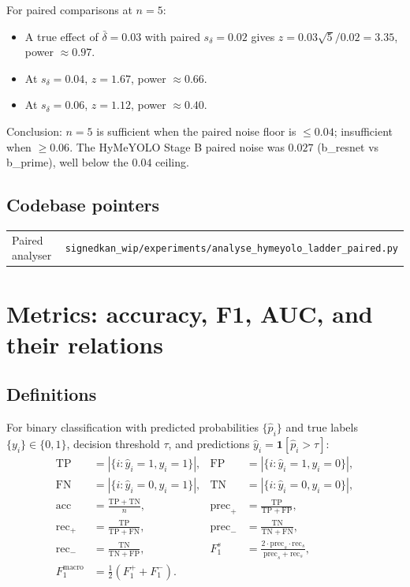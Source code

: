 \documentclass[11pt,a4paper]{article}
\theoremstyle{remark}
\newcommand{\indic}[1]{\mathbf{1}\!\left[#1\right]}
\begin{document}
For paired comparisons at $n = 5$:
\begin{itemize}
\item A true effect of $\bar\delta = 0.03$ with paired
      $s_\delta = 0.02$ gives $z = 0.03 \sqrt 5 / 0.02 = 3.35$,
      power $\approx 0.97$.
\item At $s_\delta = 0.04$, $z = 1.67$, power $\approx 0.66$.
\item At $s_\delta = 0.06$, $z = 1.12$, power $\approx 0.40$.
\end{itemize}
Conclusion: $n = 5$ is sufficient when the paired noise floor is
$\leq 0.04$; insufficient when $\geq 0.06$. The HyMeYOLO Stage B
paired noise was $0.027$ (b\_resnet vs b\_prime), well below the
$0.04$ ceiling.

\subsection{Codebase pointers}

\begin{tabular}{ll}
Paired analyser & \texttt{signedkan\_wip/experiments/analyse\_hymeyolo\_ladder\_paired.py} \\
\end{tabular}

\section{Metrics: accuracy, F1, AUC, and their relations}\label{sec:metrics}

\subsection{Definitions}

For binary classification with predicted probabilities
$\{\hat p_i\}$ and true labels $\{y_i\} \in \{0, 1\}$, decision
threshold $\tau$, and predictions $\hat y_i = \indic{\hat p_i > \tau}$:
\begin{align*}
  \mathrm{TP} &= |\{i : \hat y_i = 1, y_i = 1\}|,  &
  \mathrm{FP} &= |\{i : \hat y_i = 1, y_i = 0\}|,  \\
  \mathrm{FN} &= |\{i : \hat y_i = 0, y_i = 1\}|,  &
  \mathrm{TN} &= |\{i : \hat y_i = 0, y_i = 0\}|,  \\
  \mathrm{acc}  &= \frac{\mathrm{TP} + \mathrm{TN}}{n},   &
  \mathrm{prec}_+ &= \frac{\mathrm{TP}}{\mathrm{TP} + \mathrm{FP}},     \\
  \mathrm{rec}_+ &= \frac{\mathrm{TP}}{\mathrm{TP} + \mathrm{FN}},   &
  \mathrm{prec}_- &= \frac{\mathrm{TN}}{\mathrm{TN} + \mathrm{FN}},     \\
  \mathrm{rec}_- &= \frac{\mathrm{TN}}{\mathrm{TN} + \mathrm{FP}},   &
  F_1^s &= \frac{2 \cdot \mathrm{prec}_s \cdot \mathrm{rec}_s}{\mathrm{prec}_s + \mathrm{rec}_s}, \\
  F_1^{\text{macro}} &= \tfrac{1}{2}(F_1^+ + F_1^-).
\end{align*}
\end{document}
